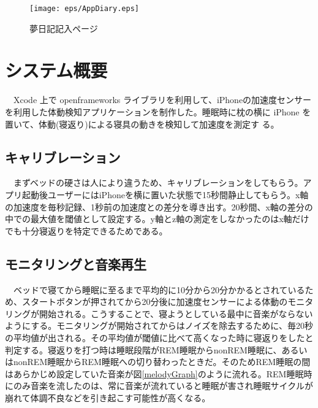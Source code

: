 \begin{figure}[htbp]
 \begin{minipage}{0.45\hsize}
  \begin{center}
   \texttt{[image: eps/AppDiary.eps]}
  \end{center}
  \caption{夢日記記入ページ}
  \label{le05}
 \end{minipage}
 \begin{minipage}{0.45\hsize}
 \end{minipage}
\end{figure}

\section{システム概要}
　Xcode 上で openframeworks ライブラリを利用して、iPhoneの加速度センサーを利用した体動検知アプリケーションを制作した。睡眠時に枕の横に iPhone を置いて、体動(寝返り)による寝具の動きを検知して加速度を測定す る。\\

\subsection{キャリブレーション}
　まずベッドの硬さは人により違うため、キャリブレーションをしてもらう。アプリ起動後ユーザーにはiPhoneを横に置いた状態で15秒間静止してもらう。x軸の加速度を毎秒記録、1秒前の加速度との差分を導き出す。20秒間、x軸の差分の中での最大値を閾値として設定する。y軸とz軸の測定をしなかったのはx軸だけでも十分寝返りを特定できるためである。\\

\subsection{モニタリングと音楽再生}
　ベッドで寝てから睡眠に至るまで平均的に10分から20分かかるとされているため、スタートボタンが押されてから20分後に加速度センサーによる体動のモニタリングが開始される。こうすることで、寝ようとしている最中に音楽がならないようにする。モニタリングが開始されてからはノイズを除去するために、毎20秒の平均値が出される。その平均値が閾値に比べて高くなった時に寝返りをしたと判定する。寝返りを打つ時は睡眠段階がREM睡眠からnonREM睡眠に、あるいはnonREM睡眠からREM睡眠への切り替わったときだ\cite{negaeri}。そのためREM睡眠の間はあらかじめ設定していた音楽が図\ref{melodyGraph}のように流れる。REM睡眠時にのみ音楽を流したのは、常に音楽が流れていると睡眠が害され睡眠サイクルが崩れて体調不良などを引き起こす可能性が高くなる。

